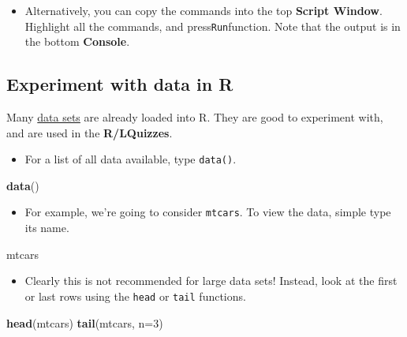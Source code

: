 \documentclass[]{article}
\newenvironment{Shaded}{\begin{snugshade}}{\end{snugshade}}
\newcommand{\DataTypeTok}[1]{\textcolor[rgb]{0.13,0.29,0.53}{#1}}
\newcommand{\DecValTok}[1]{\textcolor[rgb]{0.00,0.00,0.81}{#1}}
\newcommand{\KeywordTok}[1]{\textcolor[rgb]{0.13,0.29,0.53}{\textbf{#1}}}
\newcommand{\NormalTok}[1]{#1}
\providecommand{\tightlist}{%
  \setlength{\itemsep}{0pt}\setlength{\parskip}{0pt}}
\begin{document}
\begin{itemize}
\tightlist
\item
  Alternatively, you can copy the commands into the top \textbf{Script Window}. Highlight all the commands, and press\texttt{Run}function. Note that the output is in the bottom \textbf{Console}.
\end{itemize}

\hypertarget{experiment-with-data-in-r}{%
\subsection{Experiment with data in R}\label{experiment-with-data-in-r}}

Many \href{https://stat.ethz.ch/R-manual/R-devel/library/datasets/html/00Index.html}{data sets} are already loaded into R. They are good to experiment with, and are used in the \textbf{R/LQuizzes}.

\begin{itemize}
\tightlist
\item
  For a list of all data available, type \texttt{data()}.
\end{itemize}

\begin{Shaded}
\begin{Highlighting}[]
\KeywordTok{data}\NormalTok{()}
\end{Highlighting}
\end{Shaded}

\begin{itemize}
\tightlist
\item
  For example, we're going to consider \texttt{mtcars}. To view the data, simple type its name.
\end{itemize}

\begin{Shaded}
\begin{Highlighting}[]
\NormalTok{mtcars}
\end{Highlighting}
\end{Shaded}

\begin{itemize}
\tightlist
\item
  Clearly this is not recommended for large data sets! Instead, look at the first or last rows using the \texttt{head} or \texttt{tail} functions.
\end{itemize}

\begin{Shaded}
\begin{Highlighting}[]
\KeywordTok{head}\NormalTok{(mtcars)}
\KeywordTok{tail}\NormalTok{(mtcars, }\DataTypeTok{n=}\DecValTok{3}\NormalTok{)}
\end{Highlighting}
\end{Shaded}
\end{document}
